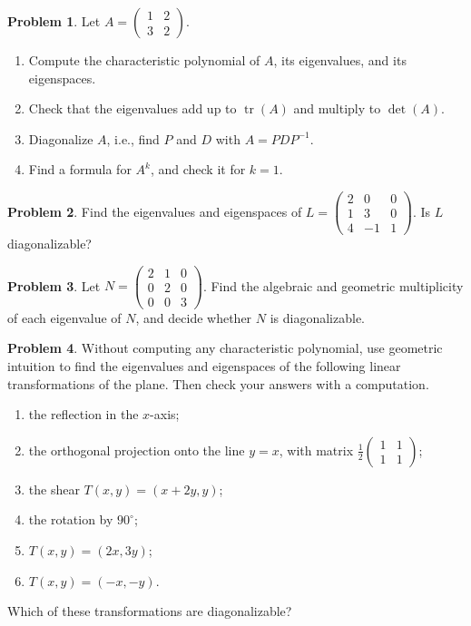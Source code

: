 \documentclass[11pt]{article}
\theoremstyle{definition}
\newtheorem{problem}{Problem}[section]
\DeclareMathOperator{\tr}{tr}
\begin{document}
\begin{problem}\label{pr:eig2}
    Let $A = \begin{pmatrix} 1 & 2 \\ 3 & 2 \end{pmatrix}$.
    \begin{enumerate}[label=(\alph*)]
        \item Compute the characteristic polynomial of $A$, its eigenvalues, and its eigenspaces.
        \item Check that the eigenvalues add up to $\tr(A)$ and multiply to $\det(A)$.
        \item Diagonalize $A$, i.e., find $P$ and $D$ with $A = PDP^{-1}$.
        \item Find a formula for $A^k$, and check it for $k = 1$.
    \end{enumerate}
\end{problem}

\begin{problem}\label{pr:eig-triangular}
    Find the eigenvalues and eigenspaces of $L = \begin{pmatrix} 2 & 0 & 0 \\ 1 & 3 & 0 \\ 4 & -1 & 1 \end{pmatrix}$. Is $L$ diagonalizable?
\end{problem}

\begin{problem}\label{pr:eig-defective}
    Let $N = \begin{pmatrix} 2 & 1 & 0 \\ 0 & 2 & 0 \\ 0 & 0 & 3 \end{pmatrix}$. Find the algebraic and geometric multiplicity of each eigenvalue of $N$, and decide whether $N$ is diagonalizable.
\end{problem}

\begin{problem}\label{pr:eig-geometric}
    Without computing any characteristic polynomial, use geometric intuition to find the eigenvalues and eigenspaces of the following linear transformations of the plane. Then check your answers with a computation.
    \begin{enumerate}[label=(\alph*)]
        \item the reflection in the $x$-axis;
        \item the orthogonal projection onto the line $y = x$, with matrix $\frac{1}{2}\begin{pmatrix} 1 & 1 \\ 1 & 1 \end{pmatrix}$;
        \item the shear $T(x, y) = (x + 2y, y)$;
        \item the rotation by $90^\circ$;
        \item $T(x, y) = (2x, 3y)$;
        \item $T(x, y) = (-x, -y)$.
    \end{enumerate}
    Which of these transformations are diagonalizable?
\end{problem}
\end{document}
